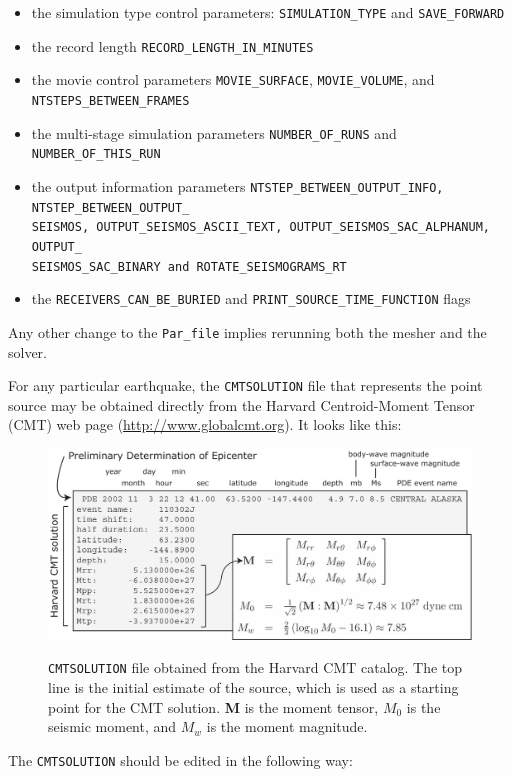 \documentclass[oneside,english]{book}
\newenvironment{lyxcode}
{\begin{list}{}{
\setlength{\rightmargin}{\leftmargin}
\setlength{\listparindent}{0pt}%
\raggedright
\setlength{\itemsep}{0pt}
\setlength{\parsep}{0pt}
\normalfont\ttfamily}%
 \item[]}
{\end{list}}
\newcommand{\urlwithparentheses}[1]{(\url{#1})}
\begin{document}
\begin{itemize}
\item the simulation type control parameters: \texttt{SIMULATION\_TYPE}
and \texttt{SAVE\_FORWARD}
\item the record length \texttt{RECORD\_LENGTH\_IN\_MINUTES}
\item the movie control parameters \texttt{MOVIE\_SURFACE}, \texttt{MOVIE\_VOLUME},
and \texttt{NTSTEPS\_BETWEEN\_FRAMES}
\item the multi-stage simulation parameters \texttt{NUMBER\_OF\_RUNS} and
\texttt{NUMBER\_OF\_THIS\_RUN}
\item the output information parameters \texttt{NTSTEP\_BETWEEN\_OUTPUT\_INFO,
NTSTEP\_BETWEEN\_OUTPUT\_}~\\
\texttt{SEISMOS, OUTPUT\_SEISMOS\_ASCII\_TEXT, OUTPUT\_SEISMOS\_SAC\_ALPHANUM,
OUTPUT\_}~\\
\texttt{SEISMOS\_SAC\_BINARY and ROTATE\_SEISMOGRAMS\_RT}
\item the \texttt{RECEIVERS\_CAN\_BE\_BURIED} and \texttt{PRINT\_SOURCE\_TIME\_FUNCTION}
flags
\end{itemize}
Any other change to the \texttt{Par\_file} implies rerunning both
the mesher and the solver.

For any particular earthquake, the \texttt{CMTSOLUTION} file that
represents the point source may be obtained directly from the Harvard Centroid-Moment Tensor (CMT) web page \urlwithparentheses{http://www.globalcmt.org}.
It looks like this:

\begin{lyxcode}
{\small }%
\begin{figure}[H]
\noindent \begin{centering}
{\small \includegraphics[width=1\textwidth]{figures/Denali_CMT} }
\par\end{centering}{\small \par}

\caption{\texttt{CMTSOLUTION} file obtained from the Harvard CMT catalog. The
top line is the initial estimate of the source, which is used as a
starting point for the CMT solution. \textbf{M} is the moment tensor,
$M_{0}${\small{} }is the seismic moment, and $M_{w}$ is the moment
magnitude.}


\label{fig:CMTSOLUTION-file}
\end{figure}
{\small \par}
\end{lyxcode}
The \texttt{CMTSOLUTION} should be edited in the following way:
\end{document}
